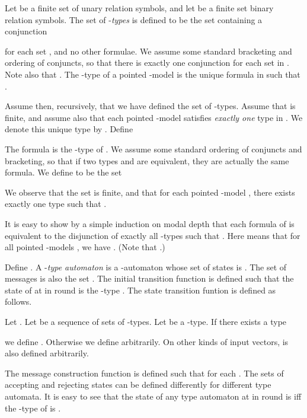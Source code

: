 \documentclass[copyright,creativecommons]{eptcs}
\begin{document}
Let  be a finite set of unary relation symbols, and let
 be a finite set binary relation symbols.
The set  of -\emph{types} 
is defined to be the set containing a conjunction 

for each set , and no other formulae. We assume some standard bracketing and ordering of
conjuncts, so that there is exactly one conjunction for each set  in . Note also
that . The -type 
of a pointed -model  is the unique formula  in 
such that .




Assume then, recursively, that we have defined the set  of -types.
Assume that  is finite, and
assume also that each pointed -model  satisfies \emph{exactly one} type in .
We denote this unique type by . Define

The formula  is the -type of . We assume some
standard ordering of conjuncts and bracketing, so that if two types  and 
are equivalent, they are actually the same formula. We define  to be the set 

We observe that the set  is finite, and that for each pointed -model , there exists
exactly one type  such that .




It is easy to show by a simple induction on modal
depth that each formula  of 
is equivalent to the disjunction of
exactly all -types  such that .
Here  means that for all pointed -models , 
we have . (Note that .)




Define .
A -\emph{type automaton}  
is a -automaton whose set of states is .
The set of messages is also the set .
The initial transition function  is defined such that the state of  at 
in round  is the -type .
The state transition funtion  is defined as follows.




Let . Let  be a sequence of sets  of -types.
Let  be a -type.
If there exists a type 

we define .
Otherwise we define  arbitrarily.
On other kinds of input vectors,  is also defined arbitrarily.





The message construction function  is defined such that  for each .
The sets of accepting and rejecting states can be defined differently
for different type automata.
It is easy to see that the state of any type automaton  at  in round  is 
iff the -type of  is .
\end{document}
